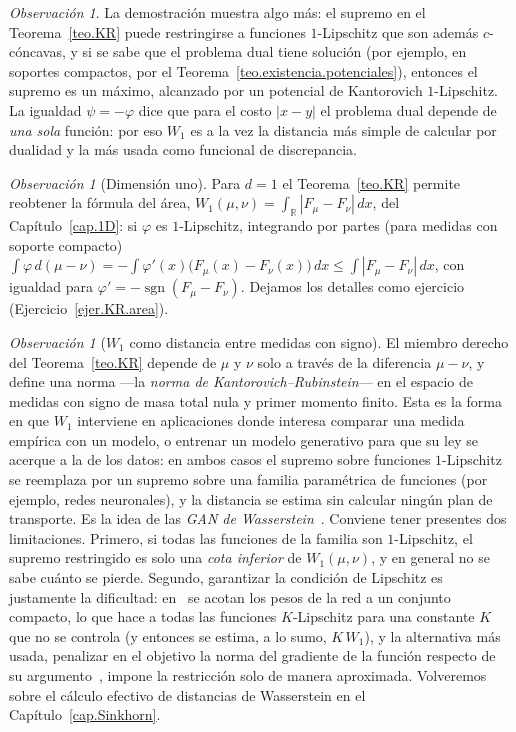 \documentclass[12pt, a4paper]{amsbook}
\newcommand{\R}{{\mathbb R}}
\theoremstyle{remark}
\newtheorem{obs}[teo]{Observación}
\theoremstyle{definition}
\numberwithin{section}{chapter}
\numberwithin{subsection}{section}
\numberwithin{equation}{section}
\numberwithin{figure}{chapter}
\begin{document}
\begin{obs}
La demostración muestra algo más: el supremo en el Teorema~\ref{teo.KR} puede
restringirse a funciones $1$-Lipschitz que son además $c$-cóncavas, y si se
sabe que el problema dual tiene solución (por ejemplo, en soportes compactos,
por el Teorema~\ref{teo.existencia.potenciales}), entonces el supremo es un
máximo, alcanzado por un potencial de Kantorovich $1$-Lipschitz. La igualdad
$\psi=-\varphi$ dice que para el costo $|x-y|$ el problema dual depende de
\emph{una sola} función: por eso $W_1$ es a la vez la distancia más simple de
calcular por dualidad y la más usada como funcional de discrepancia.
\end{obs}

\begin{obs}[Dimensión uno]
Para $d=1$ el Teorema~\ref{teo.KR} permite reobtener la fórmula del área,
$W_1(\mu,\nu)=\int_\R|F_\mu-F_\nu|\,dx$, del Capítulo~\ref{cap.1D}: si
$\varphi$ es $1$-Lipschitz, integrando por partes (para medidas con soporte
compacto) $\int\varphi\,d(\mu-\nu)=-\int\varphi'(x)\bigl(F_\mu(x)-F_\nu(x)\bigr)\,dx\le\int|F_\mu-F_\nu|\,dx$,
con igualdad para $\varphi'=-\operatorname{sgn}(F_\mu-F_\nu)$. Dejamos los
detalles como ejercicio (Ejercicio~\ref{ejer.KR.area}).
\end{obs}

\begin{obs}[$W_1$ como distancia entre medidas con signo]
El miembro derecho del Teorema~\ref{teo.KR} depende de $\mu$ y $\nu$ solo a
través de la diferencia $\mu-\nu$, y define una norma —la \emph{norma de
Kantorovich--Rubinstein}— en el espacio de medidas con signo de masa total
nula y primer momento finito. Esta es la forma en que $W_1$ interviene en
aplicaciones donde interesa comparar una medida empírica con un modelo, o
entrenar un modelo generativo para que su ley se acerque a la de los datos:
en ambos casos el supremo sobre funciones $1$-Lipschitz se reemplaza por un
supremo sobre una familia paramétrica de funciones (por ejemplo, redes
neuronales), y la distancia se estima sin calcular ningún plan de
transporte. Es la idea de las \emph{GAN de Wasserstein}~\cite{Arjovsky2017}.
Conviene tener presentes dos limitaciones. Primero, si todas las funciones
de la familia son $1$-Lipschitz, el supremo restringido es solo una
\emph{cota inferior} de $W_1(\mu,\nu)$, y en general no se sabe cuánto se
pierde. Segundo, garantizar la condición de Lipschitz es justamente la
dificultad: en~\cite{Arjovsky2017} se acotan los pesos de la red a un
conjunto compacto, lo que hace a todas las funciones $K$-Lipschitz para una
constante $K$ que no se controla (y entonces se estima, a lo sumo,
$K\,W_1$), y la alternativa más usada, penalizar en el objetivo la norma
del gradiente de la función respecto de su argumento~\cite{Gulrajani2017},
impone la restricción solo de manera aproximada. Volveremos sobre el cálculo
efectivo de distancias de Wasserstein en el Capítulo~\ref{cap.Sinkhorn}.
\end{obs}
\end{document}
